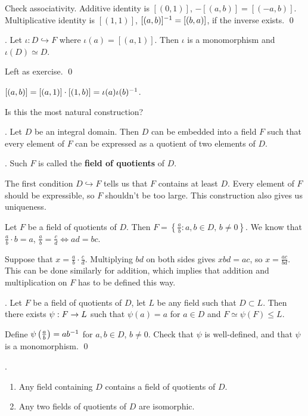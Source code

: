 \pf Check associativity. Additive identity is \([(0, 1)]\), \(-[(a, b)] = [(-a, b)]\). Multiplicative identity is \([(1, 1)]\), \([(a, b)]^{-1} = [(b, a)]\), if the inverse exists. \qed

\lemma. Let \(\iota : D \hookrightarrow F\) where \(\iota(a) = [(a, 1)]\). Then \(\iota\) is a monomorphism and \(\iota(D) \simeq D\).

\pf Left as exercise. \qed

\rmk \([(a, b)] = [(a, 1)] \cdot [(1, b)] = \iota(a) \iota(b)^{-1}\).

Is this the most natural construction?

\thm. Let \(D\) be an integral domain. Then \(D\) can be embedded into a field \(F\) such that every element of \(F\) can be expressed as a quotient of two elements of \(D\).

.  Such \(F\) is called the \textbf{field of quotients} of \(D\).

\rmk The first condition \(D \hookrightarrow F\) tells us that \(F\) contains at least \(D\). Every element of \(F\) should be expressible, so \(F\) shouldn't be too large. This construction also gives us uniqueness.

Let \(F\) be a field of quotients of \(D\). Then \(F = \left\{\frac{a}{b} : a, b \in D,\, b \neq 0\right\}\). We know that \(\frac{a}{b} \cdot b = a\), \(\frac{a}{b} = \frac{c}{d} \iff ad = bc\).

Suppose that \(x = \frac{a}{b} \cdot \frac{c}{d}\). Multiplying \(bd\) on both sides gives \(xbd = ac\), so \(x = \frac{ac}{bd}\). This can be done similarly for addition, which implies that addition and multiplication on \(F\) has to be defined this way.

\thm. Let \(F\) be a field of quotients of \(D\), let \(L\) be any field such that \(D \subset L\). Then there exists \(\psi : F \rightarrow L\) such that \(\psi(a) = a\) for \(a \in D\) and \(F \simeq \psi(F) \leq L\).

\pf Define \(\psi\left( \frac{a}{b} \right) = ab^{-1}\) for \(a, b \in D\), \(b \neq 0\). Check that \(\psi\) is well-defined, and that \(\psi\) is a monomorphism. \qed

\cor.
\begin{enumerate}
    \item Any field containing \(D\) contains a field of quotients of \(D\).
    \item Any two fields of quotients of \(D\) are isomorphic.
\end{enumerate}

